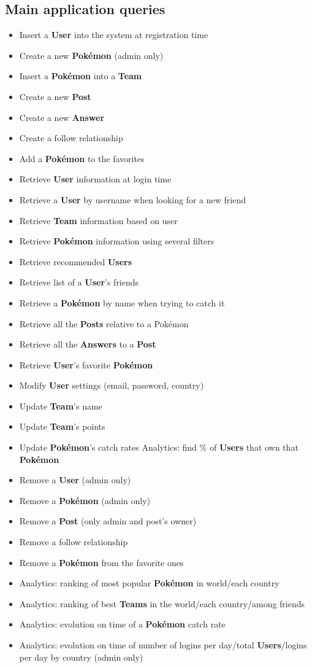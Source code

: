 \subsection{Main application queries}
\begin{itemize}
	\item Insert a \textbf{User} into the system at registration time
	\item Create a new \textbf{Pokémon} (admin only)
	\item Insert a \textbf{Pokémon} into a \textbf{Team}
	\item Create a new \textbf{Post}
	\item Create a new \textbf{Answer}
	\item Create a follow relationship
	\item Add a \textbf{Pokémon} to the favorites
	\item Retrieve \textbf{User} information at login time
 	\item Retrieve a \textbf{User} by username when looking for a new friend
	\item Retrieve \textbf{Team} information based on user
	\item Retrieve \textbf{Pokémon} information using several filters
	\item Retrieve recommended \textbf{Users}
	\item Retrieve list of a \textbf{User}’s friends
	\item Retrieve a \textbf{Pokémon} by name when trying to catch it
	\item Retrieve all the \textbf{Posts} relative to a Pokémon
	\item Retrieve all the \textbf{Answers} to a \textbf{Post}
	\item Retrieve \textbf{User}’s favorite \textbf{Pokémon} 
	\item Modify \textbf{User} settings (email, password, country)
	\item Update \textbf{Team}’s name
	\item Update \textbf{Team}’s points
	\item Update \textbf{Pokémon}’s catch rates Analytics: find $\%$ of \textbf{Users} that own that \textbf{Pokémon}
	\item Remove a \textbf{User} (admin only)
	\item Remove a \textbf{Pokémon} (admin only)
	\item Remove a \textbf{Post} (only admin and post’s owner)
	\item Remove a follow relationship
	\item Remove a \textbf{Pokémon} from the favorite ones
	\item Analytics: ranking of most popular \textbf{Pokémon} in world/each country
	\item Analytics: ranking of best \textbf{Teams} in the world/each country/among friends
	\item Analytics: evolution on time of a \textbf{Pokémon} catch rate
	\item Analytics: evolution on time of number of logins per day/total \textbf{Users}/logins per day by country (admin only)
\end{itemize}